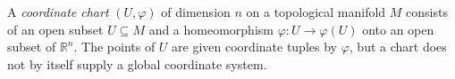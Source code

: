 
A \emph{coordinate chart} $(U,\varphi)$ of dimension $n$ on a topological manifold $M$ consists of an open subset $U\subseteq M$ and a homeomorphism $\varphi:U\to\varphi(U)$ onto an open subset of $\mathbb R^n$. The points of $U$ are given coordinate tuples by $\varphi$, but a chart does not by itself supply a global coordinate system.
